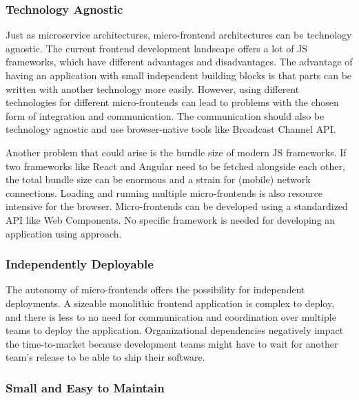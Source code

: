 \subsubsection{Technology Agnostic}\label{subsubsection:background:micro-frontend-technology-agnostic}

Just as microservice architectures, micro-frontend architectures can be technology agnostic. The current frontend development landscape offers a lot of \ac{JS} frameworks, which have different advantages and disadvantages. The advantage of having an application with small independent building blocks is that parts can be written with another technology more easily. \cite[14-16]{book:2020:geers:background:micro-frontends:micro-frontends-in-action} However, using different technologies for different micro-frontends can lead to problems with the chosen form of integration and communication. The communication should also be technology agnostic and use browser-native tools like Broadcast Channel \ac{API}.

\bigskip

\noindent Another problem that could arise is the bundle size of modern \ac{JS} frameworks. If two frameworks like React and Angular need to be fetched alongside each other, the total bundle size can be enormous and a strain for (mobile) network connections. Loading and running multiple micro-frontends is also resource intensive for the browser. Micro-frontends can be developed using a standardized \ac{API} like Web Components. No specific framework is needed for developing an application using approach. \cite{book:2020:geers:background:micro-frontends:micro-frontends-in-action}

\subsubsection{Independently Deployable}\label{subsubsection:background:micro-frontend-independent-deployable}

The autonomy of micro-frontends offers the possibility for independent deployments. A sizeable monolithic frontend application is complex to deploy, and there is less to no need for communication and coordination over multiple teams to deploy the application. Organizational dependencies negatively impact the time-to-market because development teams might have to wait for another team's release to be able to ship their software. \cite[12]{book:2020:geers:background:micro-frontends:micro-frontends-in-action}

\subsubsection{Small and Easy to Maintain}\label{subsubsection:background:micro-frontend-small-and-easy-to-maintain}

